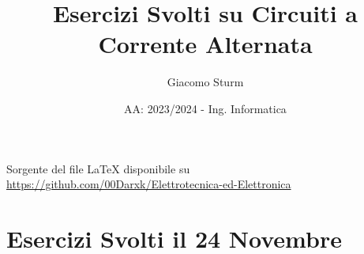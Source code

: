 \documentclass{article}
\title{Esercizi Svolti su Circuiti a Corrente Alternata}
\author{Giacomo Sturm}
\date{AA: 2023/2024 - Ing. Informatica}
\begin{document}

\pagestyle{fancy}
\fancyhead{}\fancyfoot{}
\fancyfoot[C]{\thepage}

\maketitle

\vspace{10mm}

\begin{center}
    Sorgente del file LaTeX disponibile su \url{https://github.com/00Darxk/Elettrotecnica-ed-Elettronica}
\end{center}

\clearpage

\tableofcontents

\clearpage


\section{Esercizi Svolti il 24 Novembre}
\end{document}
